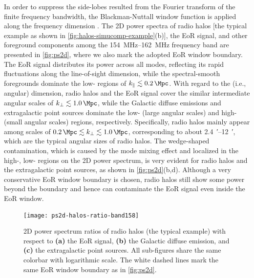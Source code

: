 \documentclass[modern]{aastex62}
\newcommand{\klos}{\text{$k_{\parallel}$}}
\newcommand{\kperp}{\text{$k_{\bot}$}}
\begin{document}
In order to suppress the side-lobes resulted from the Fourier transform of
the finite frequency bandwidth, the Blackman-Nuttall window function is
applied along the frequency dimension \citep[e.g.,][]{trott2015,chapman2016}.
The 2D power spectra of radio halos [the typical example as shown in
\autoref{fig:halos-simucomp-example}(b)], the EoR signal, and other
foreground components among the \SIrange{154}{162}{\MHz} frequency band
are presented in \autoref{fig:ps2d},
where we also mark the adopted EoR window boundary.
The EoR signal distributes its power across all \klos{} modes, reflecting
its rapid fluctuations along the line-of-sight dimension,
while the spectral-smooth foregrounds dominate the low-\klos{} regions
of $\klos{} \lesssim \SI{0.2}{\per\Mpc}$.
With regard to the \kperp{} (i.e., angular) dimension,
radio halos and the EoR signal cover the similar intermediate angular
scales of $\kperp \lesssim \SI{1.0}{\per\Mpc}$,
while the Galactic diffuse emissions and extragalactic point sources
dominate the low-\kperp{} (large angular scales) and high-\kperp{}
(small angular scales) regions, respectively.
Specifically, radio halos mainly appear among scales of
$\SI{0.2}{\per\Mpc} \lesssim \kperp \lesssim \SI{1.0}{\per\Mpc}$,
corresponding to about \SIrange[range-units=repeat]{2.4}{12}{\arcminute},
which are the typical angular sizes of radio halos.
The wedge-shaped contamination, which is caused by the mode mixing effect
and localized in the high-\kperp{}, low-\klos{} regions on the 2D power
spectrum, is very evident for radio halos and the extragalactic point
sources, as shown in \autoref{fig:ps2d}(b,d).
Although a very conservative EoR window boundary is chosen, radio halos
still show some power beyond the boundary and hence can contaminate the
EoR signal even inside the EoR window.

\begin{figure}
  \centering
  \texttt{[image: ps2d-halos-ratio-band158]}
  \caption{\label{fig:ps2d-ratio}%
    2D power spectrum ratios of radio halos (the typical example) with
    respect to
    \textbf{(a)} the EoR signal,
    \textbf{(b)} the Galactic diffuse emission,
    and
    \textbf{(c)} the extragalactic point sources.
    All sub-figures share the same colorbar with logarithmic scale.
    The white dashed lines mark the same EoR window boundary as in
    \autoref{fig:ps2d}.
  }
\end{figure}
\end{document}

